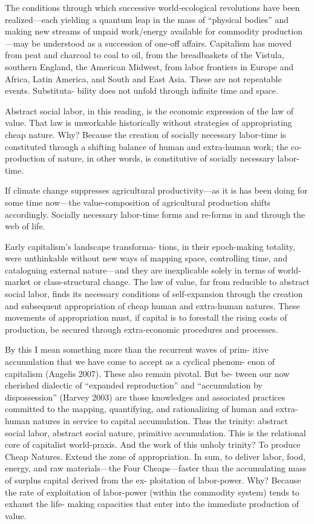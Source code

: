 \documentclass[
]{book}
\begin{document}
The
conditions through which successive world-ecological revolutions have
been realized---each yielding a quantum leap in the mass of ``physical
bodies'' and making new streams of unpaid work/energy available for
commodity production---may be understood as a succession of one-off
affairs. Capitalism has moved from peat and charcoal to coal to oil,
from the breadbaskets of the Vistula, southern England, the American
Midwest, from labor frontiers in Europe and Africa, Latin America,
and South and East Asia. These are not repeatable events. Substituta-
bility does not unfold through infinite time and space.

Abstract social labor, in this reading, is the economic expression of
the law of value. That law is unworkable historically without strategies
of appropriating cheap nature. Why? Because the creation of socially
necessary labor-time is constituted through a shifting balance of
human and extra-human work; the co-production of nature, in other words,
is constitutive of socially necessary labor-time.

If climate change suppresses agricultural productivity---as it is has been doing for some
time now---the value-composition of agricultural production shifts
accordingly. Socially necessary labor-time forms and re-forms in and
through the web of life.

Early capitalism's landscape transforma-
tions, in their epoch-making totality, were unthinkable without new
ways of mapping space, controlling time, and cataloguing external
nature---and they are inexplicable solely in terms of world-market or
class-structural change. The law of value, far from reducible to
abstract social labor, finds its necessary conditions of self-expansion
through the creation and subsequent appropriation of cheap human
and extra-human natures. These movements of appropriation must,
if capital is to forestall the rising costs of production, be secured
through extra-economic procedures and processes.

By this I mean something more than the recurrent waves of prim-
itive accumulation that we have come to accept as a cyclical phenom-
enon of capitalism (Angelis 2007). These also remain pivotal. But be-
tween our now cherished dialectic of ``expanded reproduction'' and
``accumulation by dispossession'' (Harvey 2003) are those knowledges
and associated practices committed to the mapping, quantifying, and
rationalizing of human and extra-human natures in service to capital
accumulation. Thus the trinity: abstract social labor, abstract social
nature, primitive accumulation. This is the relational core of capitalist
world-praxis. And the work of this unholy trinity? To produce
Cheap Natures. Extend the zone of appropriation. In sum, to deliver
labor, food, energy, and raw materials---the Four Cheaps---faster
than the accumulating mass of surplus capital derived from the ex-
ploitation of labor-power. Why? Because the rate of exploitation of
labor-power (within the commodity system) tends to exhaust the life-
making capacities that enter into the immediate production of value.
\end{document}
